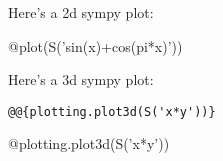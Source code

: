 \documentclass{article}
\begin{document}
Here's a 2d sympy plot:

@{plot(S('sin(x)+cos(pi*x)'))}

Here's a 3d sympy plot:

\begin{verbatim}
@@{plotting.plot3d(S('x*y'))}
\end{verbatim}

@{plotting.plot3d(S('x*y'))}
\end{document}
